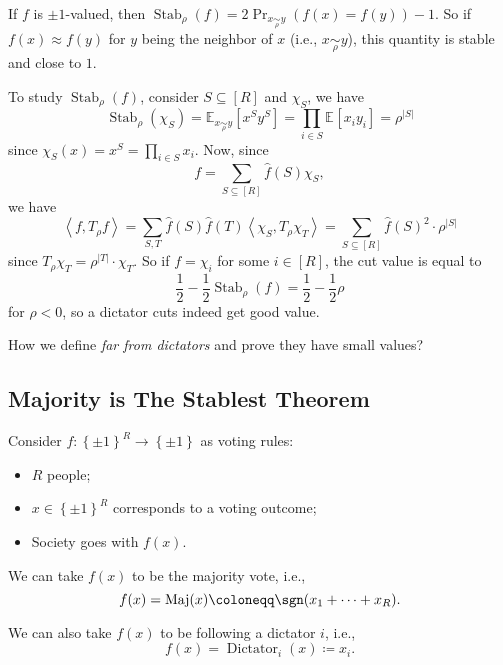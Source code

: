 \begin{remark}
	If \(f\) is \(\pm 1\)-valued, then \(\mathop{\mathrm{Stab}}_\rho (f) = 2\Pr_{x \underset{\rho }{\sim }y }(f(x) = f(y)) -1 \). So if \(f(x) \approx f(y)\) for \(y\) being the neighbor of \(x\) (i.e., \(x \underset{\rho }{\sim }y \)), this quantity is stable and close to \(1\).
\end{remark}

To study \(\mathop{\mathrm{Stab}}_\rho (f)\), consider \(S \subseteq [R]\) and \(\chi _S\), we have
\[
	\mathop{\mathrm{Stab}}_\rho (\chi _S)
	= \mathbb{E}_{x \underset{\rho }{\sim }y }\left[x^S y^S \right]
	= \prod_{i\in S} \mathbb{E}_{}\left[x_i y_i \right]
	= \rho ^{\vert S \vert }
\]
since \(\chi _S(x) = x^S = \prod_{i\in S}^{} x_i\). Now, since
\[
	f = \sum_{S \subseteq [R]} \hat{f} (S) \chi _S,
\]
we have
\[
	\left\langle f, T_{\rho }f \right\rangle
	= \sum_{S, T} \hat{f} (S) \hat{f} (T) \left\langle \chi _S, T_\rho \chi _T \right\rangle
	= \sum_{S\subseteq [R]} \hat{f} (S)^2 \cdot \rho ^{\vert S \vert }
\]
since \(T_\rho \chi _T = \rho ^{\vert T \vert }\cdot \chi _T\). So if \(f = \chi _i\) for some \(i\in [R]\), the cut value is equal to
\[
	\frac{1}{2} - \frac{1}{2} \mathop{\mathrm{Stab}}_\rho (f) = \frac{1}{2} - \frac{1}{2}\rho
\]
for \(\rho < 0\), so a dictator cuts indeed get good value.

\begin{problem*}
	How we define \emph{far from dictators} and prove they have small values?
\end{problem*}

\subsection{Majority is The Stablest Theorem}
Consider \(f\colon \left\{ \pm 1 \right\} ^R \to \left\{ \pm 1 \right\} \) as voting rules:
\begin{itemize}
	\item \(R\) people;
	\item \(x\in \left\{ \pm 1 \right\} ^R\) corresponds to a voting outcome;
	\item Society goes with \(f(x)\).
\end{itemize}

\begin{eg}[Majority]
	We can take \(f(x)\) to be the majority vote, i.e.,
	\[
		f(x) = \mathop{\mathrm{Maj}}(x) \coloneqq \sgn(x_1 + \dots + x_R ).
	\]
\end{eg}

\begin{eg}[Dictator]
	We can also take \(f(x)\) to be following a dictator \(i\), i.e.,
	\[
		f(x) = \mathop{\mathrm{Dictator}}\nolimits_i(x) \coloneqq x_i.
	\]
\end{eg}

